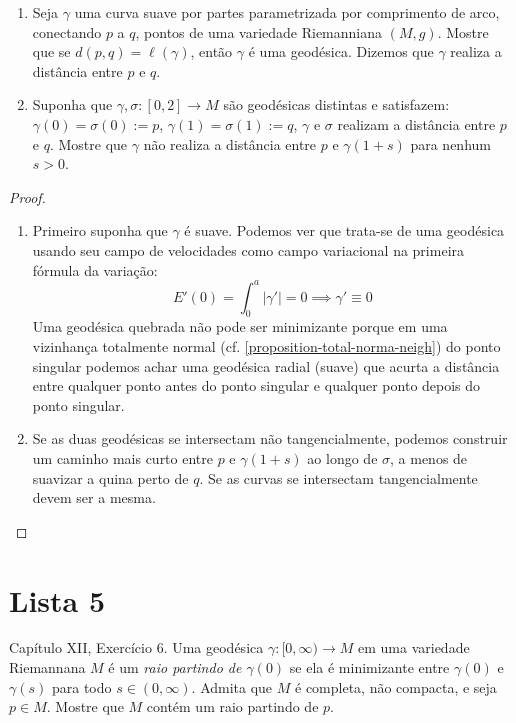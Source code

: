 \begin{exercise}
\label{exercise-curvas-minimizantes}
\begin{enumerate}
\item Seja $\gamma$ uma curva suave por
partes parametrizada por comprimento de
 arco, conectando $p$ a $q$, pontos de uma
 variedade Riemanniana $(M,g)$.
 Mostre que se $d(p,q)=\ell(\gamma)$, então
 $\gamma$ é uma geodésica.
 Dizemos que $\gamma$ realiza a distância
 entre $p$ e $q$.
\item Suponha que $\gamma,\sigma:[0,2]\to M$
são geodésicas distintas
 e satisfazem: $\gamma(0)=\sigma(0):=p$,
 $\gamma(1)=\sigma(1):=q$,
$\gamma$ e $\sigma$ realizam a distância
entre $p$ e $q$.
 Mostre que $\gamma$ não realiza a distância
 entre $p$ e $\gamma(1+s)$
para nenhum $s>0$.
\end{enumerate}
\end{exercise}

\begin{proof}
\begin{enumerate}
\item Primeiro suponha que $\gamma$ é suave.
Podemos ver que trata-se de uma
geodésica usando seu campo de velocidades
como campo variacional na primeira
fórmula da variação:
$$
E'(0)=\int_0^a |\gamma'|=0 \implies
\gamma'\equiv 0
$$
Uma geodésica quebrada não pode ser
minimizante porque em uma vizinhança
totalmente normal (cf.
\ref{proposition-total-norma-neigh})
do ponto singular podemos achar uma geodésica
radial (suave)
 que acurta a distância entre qualquer ponto
 antes do ponto singular
 e qualquer ponto depois do ponto singular.
\item Se as duas geodésicas se intersectam
não tangencialmente, podemos
construir um caminho mais curto entre $p$ e
$\gamma(1+s)$ ao longo de $\sigma$,
a menos de suavizar a quina perto de $q$. Se
as curvas se intersectam
 tangencialmente devem ser a mesma.
\end{enumerate}
\end{proof}

\section{Lista 5}
\label{section-lista-5}

\begin{exercise}
\label{exercise-l5-5}
\cite{doc} Capítulo XII, Exercício 6. Uma
geodésica $\gamma:[0,\infty)\to M$ em
uma variedade Riemannana $M$ é um {\it raio
partindo de $\gamma(0)$} se ela é
minimizante entre $\gamma(0)$ e $\gamma(s)$
para todo  $s \in (0,\infty)$.
Admita que $M$ é completa, não compacta, e
seja $p \in M$. Mostre que $M$ contém
um raio partindo de $p$.
\end{exercise}

